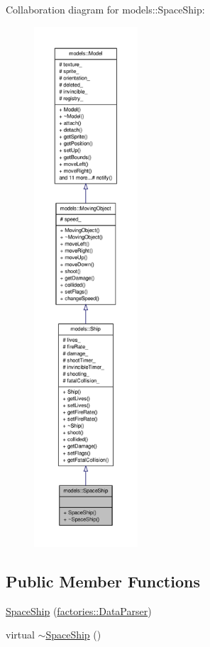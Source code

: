 \-Collaboration diagram for models\-:\-:\-Space\-Ship\-:
\nopagebreak
\begin{figure}[H]
\begin{center}
\leavevmode
\includegraphics[height=550pt]{d6/da5/classmodels_1_1SpaceShip__coll__graph}
\end{center}
\end{figure}
\subsection*{\-Public \-Member \-Functions}
\begin{DoxyCompactItemize}
\item 
\hyperlink{classmodels_1_1SpaceShip_a7f7ca300732cc4871405dc784b29943d}{\-Space\-Ship} (\hyperlink{classfactories_1_1DataParser}{factories\-::\-Data\-Parser})
\item 
virtual \hyperlink{classmodels_1_1SpaceShip_a851a37ae8e12afea56446e21d95e683e}{$\sim$\-Space\-Ship} ()
\end{DoxyCompactItemize}


